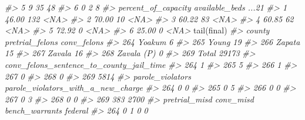 \documentclass[
]{krantz}
\makeatletter
\newenvironment{Shaded}{\begin{snugshade}}{\end{snugshade}}
\newcommand{\CommentTok}[1]{\textcolor[rgb]{0.37,0.37,0.37}{\textit{#1}}}
\newcommand{\FunctionTok}[1]{\textcolor[rgb]{0,0,0}{#1}}
\newcommand{\NormalTok}[1]{#1}
\newenvironment{kframe}{%
\medskip{}
\setlength{\fboxsep}{.8em}
 \def\at@end@of@kframe{}%
 \ifinner\ifhmode%
  \def\at@end@of@kframe{\end{minipage}}%
  \begin{minipage}{\columnwidth}%
 \fi\fi%
 \def\FrameCommand##1{\hskip\@totalleftmargin \hskip-\fboxsep
 \colorbox{shadecolor}{##1}\hskip-\fboxsep
     \hskip-\linewidth \hskip-\@totalleftmargin \hskip\columnwidth}%
 \MakeFramed {\advance\hsize-\width
   \@totalleftmargin\z@ \linewidth\hsize
   \@setminipage}}%
 {\par\unskip\endMakeFramed%
 \at@end@of@kframe}
\renewenvironment{Shaded}{\begin{kframe}}{\end{kframe}}
\makeatother
\begin{document}
\begin{Shaded}
\begin{Highlighting}[]
\CommentTok{\#\textgreater{} 5              9               35             48}
\CommentTok{\#\textgreater{} 6              0                2              8}
\CommentTok{\#\textgreater{}   percent\_of\_capacity available\_beds ...21}
\CommentTok{\#\textgreater{} 1               46.00            132  \textless{}NA\textgreater{}}
\CommentTok{\#\textgreater{} 2               70.00             10  \textless{}NA\textgreater{}}
\CommentTok{\#\textgreater{} 3               60.22             83  \textless{}NA\textgreater{}}
\CommentTok{\#\textgreater{} 4               60.85             62  \textless{}NA\textgreater{}}
\CommentTok{\#\textgreater{} 5               72.92              0  \textless{}NA\textgreater{}}
\CommentTok{\#\textgreater{} 6               25.00              0  \textless{}NA\textgreater{}}
\FunctionTok{tail}\NormalTok{(final)}
\CommentTok{\#\textgreater{}         county pretrial\_felons conv\_felons}
\CommentTok{\#\textgreater{} 264     Yoakum                           6}
\CommentTok{\#\textgreater{} 265      Young                          19}
\CommentTok{\#\textgreater{} 266     Zapata                          15}
\CommentTok{\#\textgreater{} 267     Zavala                          16}
\CommentTok{\#\textgreater{} 268 Zavala (P)                           0}
\CommentTok{\#\textgreater{} 269                      Total       29173}
\CommentTok{\#\textgreater{}     conv\_felons\_sentence\_to\_county\_jail\_time}
\CommentTok{\#\textgreater{} 264                                        1}
\CommentTok{\#\textgreater{} 265                                        5}
\CommentTok{\#\textgreater{} 266                                        1}
\CommentTok{\#\textgreater{} 267                                        0}
\CommentTok{\#\textgreater{} 268                                        0}
\CommentTok{\#\textgreater{} 269                                     5814}
\CommentTok{\#\textgreater{}     parole\_violators parole\_violators\_with\_a\_new\_charge}
\CommentTok{\#\textgreater{} 264                0                                  0}
\CommentTok{\#\textgreater{} 265                0                                  5}
\CommentTok{\#\textgreater{} 266                0                                  0}
\CommentTok{\#\textgreater{} 267                0                                  3}
\CommentTok{\#\textgreater{} 268                0                                  0}
\CommentTok{\#\textgreater{} 269              383                               2700}
\CommentTok{\#\textgreater{}     pretrial\_misd conv\_misd bench\_warrants federal}
\CommentTok{\#\textgreater{} 264             0         1              0       0}

\end{Highlighting}
\end{Shaded}
\end{document}
